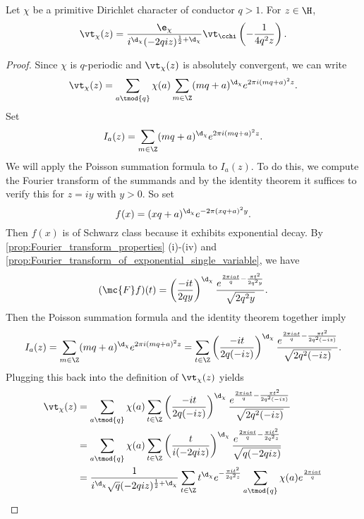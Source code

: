       \begin{theorem}\label{thm:functional_equation_Dirichlet_theta}
        Let $\chi$ be a primitive Dirichlet character of conductor $q > 1$. For $z \in \H$,
        \[
          \vt_{\chi}(z) = \frac{\e_{\chi}}{i^{\d_{\chi}}(-2qiz)^{\frac{1}{2}+\d_{\chi}}}\vt_{\cchi}\left(-\frac{1}{4q^{2}z}\right).
        \]
      \end{theorem}
      \begin{proof}
        Since $\chi$ is $q$-periodic and $\vt_{\chi}(z)$ is absolutely convergent, we can write
        \[
          \vt_{\chi}(z) = \sum_{a \tmod{q}}\chi(a)\sum_{m \in \Z}(mq+a)^{\d_{\chi}}e^{2\pi i(mq+a)^{2}z}.
        \]
        Set
        \[
          I_{a}(z) = \sum_{m \in \Z}(mq+a)^{\d_{\chi}}e^{2\pi i(mq+a)^{2}z}.
        \]
        We will apply the Poisson summation formula to $I_{a}(z)$. To do this, we compute the Fourier transform of the summands and by the identity theorem it suffices to verify this for $z = iy$ with $y > 0$. So set
        \[
          f(x) = (xq+a)^{\d_{\chi}}e^{-2\pi(xq+a)^{2}y}.
        \]
        Then $f(x)$ is of Schwarz class because it exhibits exponential decay. By \cref{prop:Fourier_transform_properties} (i)-(iv) and \cref{prop:Fourier_transform_of_exponential_single_variable}, we have
        \[
          (\mc{F}f)(t) = \left(\frac{-it}{2qy}\right)^{\d_{\chi}}\frac{e^{\frac{2\pi iat}{q}-\frac{\pi t^{2}}{2q^{2}y}}}{\sqrt{2q^{2}y}}.
        \]
        Then the Poisson summation formula and the identity theorem together imply
        \[
          I_{a}(z) = \sum_{m \in \Z}(mq+a)^{\d_{\chi}}e^{2\pi i(mq+a)^{2}z} = \sum_{t \in \Z}\left(\frac{-it}{2q(-iz)}\right)^{\d_{\chi}}\frac{e^{\frac{2\pi iat}{q}-\frac{\pi t^{2}}{2q^{2}(-iz)}}}{\sqrt{2q^{2}(-iz)}}.
        \]
        Plugging this back into the definition of $\vt_{\chi}(z)$ yields
        \begin{align*}
          \vt_{\chi}(z) &= \sum_{a \tmod{q}}\chi(a)\sum_{t \in \Z}\left(\frac{-it}{2q(-iz)}\right)^{\d_{\chi}}\frac{e^{\frac{2\pi iat}{q}-\frac{\pi t^{2}}{2q^{2}(-iz)}}}{\sqrt{2q^{2}(-iz)}} \\
          &= \sum_{a \tmod{q}}\chi(a)\sum_{t \in \Z}\left(\frac{t}{i(-2qiz)}\right)^{\d_{\chi}}\frac{e^{\frac{2\pi iat}{q}-\frac{\pi it^{2}}{2q^{2}z}}}{\sqrt{q(-2qiz)}} \\
          &= \frac{1}{i^{\d_{\chi}}\sqrt{q}(-2qiz)^{\frac{1}{2}+\d_{\chi}}}\sum_{t \in \Z}t^{\d_{\chi}}e^{-\frac{\pi it^{2}}{2q^{2}z}}\sum_{a \tmod{q}}\chi(a)e^{\frac{2\pi i at}{q}} \\

\end{align*}
\end{proof}
